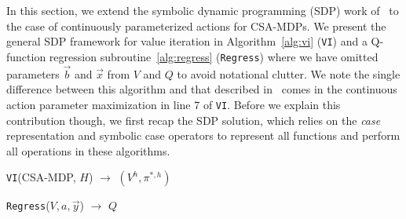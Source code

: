 \label{sec:sdp}

In this section, we extend the symbolic dynamic programming (SDP) work
of~\cite{sanner_uai11} to the case of continuously parameterized
actions for CSA-MDPs.  We present the general SDP framework for value
iteration in Algorithm~\ref{alg:vi} (\texttt{VI})
and a Q-function regression subroutine~\ref{alg:regress} (\texttt{Regress}) 
where we have omitted parameters $\vec{b}$ and $\vec{x}$ from $V$ and $Q$
to avoid notational clutter.  We note the single difference between
this algorithm and that described in~\cite{sanner_uai11} comes in 
the continuous action parameter maximization in line 7
of \texttt{VI}.  Before we explain this contribution though, we
first recap the SDP solution, which relies on the \emph{case} representation
and symbolic case operators to represent all functions
and perform all operations in these algorithms.

\incmargin{.5em}
\linesnumbered
\begin{algorithm}[t!]
\dontprintsemicolon
{}
\caption{\footnotesize \texttt{VI}(CSA-MDP, $H$) $\longrightarrow$ $(V^h,\pi^{*,h})$ \label{alg:vi}}
\end{algorithm}
\decmargin{.5em}

\incmargin{.5em}
\linesnumbered
\begin{algorithm}[t!]
\dontprintsemicolon
{}


\caption{\footnotesize \texttt{Regress}($V,a,\vec{y}$) $\longrightarrow$ $Q$ \label{alg:regress}}
\end{algorithm}
\decmargin{.5em}


